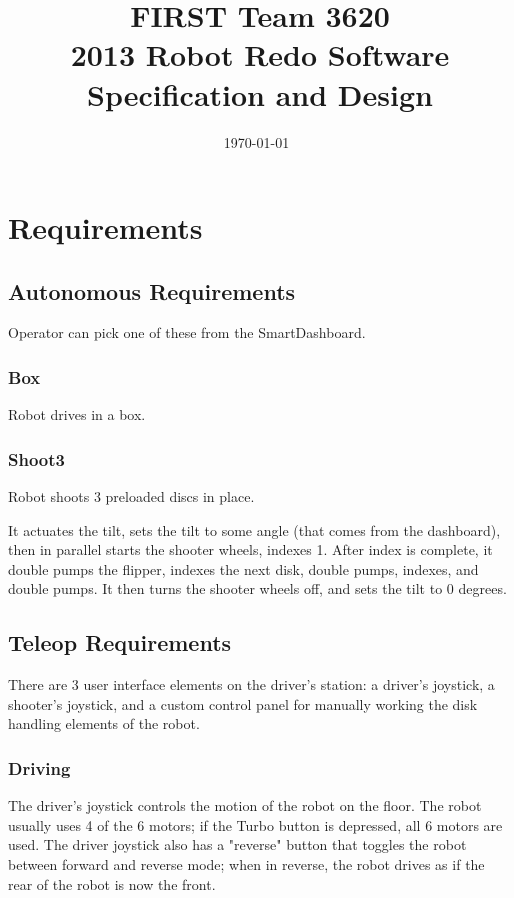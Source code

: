 \documentclass[]{article}
\title{FIRST Team 3620\\
 2013 Robot Redo Software Specification and Design}
\date{\today\ \currenttime}
\begin{document}
\maketitle

\tableofcontents
\newpage

\section{Requirements}

\subsection{Autonomous Requirements}
Operator can pick one of these from the SmartDashboard.
\subsubsection{Box}
Robot drives in a box.

\subsubsection{Shoot3}
Robot shoots 3 preloaded discs in place.

It actuates the tilt, sets the tilt to some angle (that comes from the dashboard), then in parallel starts the shooter wheels, indexes 1.
After index is complete, it double pumps the flipper, indexes the next disk, double pumps, indexes, and double pumps.
It then turns the shooter wheels off, and sets the tilt to 0 degrees.

\subsection{Teleop Requirements}

There are 3 user interface elements on the driver's station: a driver's joystick, a shooter's joystick, and a custom control panel for manually working the disk handling elements of the robot.

\subsubsection{Driving}
The driver's joystick controls the motion of the robot on the floor.
The robot usually uses 4 of the 6 motors; if the Turbo button is depressed, all 6 motors are used.
The driver joystick also has a "reverse" button that toggles the robot between forward and reverse mode; when in reverse, the robot drives as if the rear of the robot is now the front.
\end{document}
